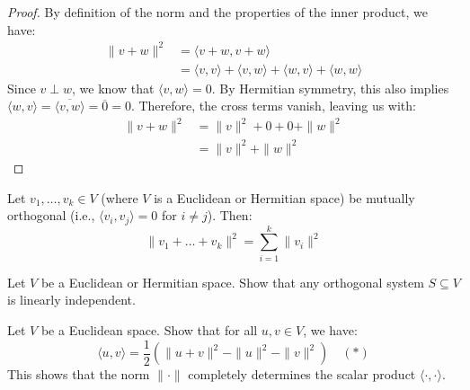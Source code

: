 \begin{center}
\end{center}

\begin{proof}
By definition of the norm and the properties of the inner product, we have:
\begin{align*}
    \|v + w\|^2 &= \langle v + w, v + w \rangle \\
    &= \langle v, v \rangle + \langle v, w \rangle + \langle w, v \rangle + \langle w, w \rangle
\end{align*}
Since $v \perp w$, we know that $\langle v, w \rangle = 0$. By Hermitian symmetry, this also implies $\langle w, v \rangle = \overline{\langle v, w \rangle} = \overline{0} = 0$. Therefore, the cross terms vanish, leaving us with:
\begin{align*}
    \|v + w\|^2 &= \|v\|^2 + 0 + 0 + \|w\|^2 \\
    &= \|v\|^2 + \|w\|^2
\end{align*}
\end{proof}

\begin{exercise}
Let $v_1, \dots, v_k \in V$ (where $V$ is a Euclidean or Hermitian space) be mutually orthogonal (i.e., $\langle v_i, v_j \rangle = 0$ for $i \neq j$). Then:
\[
    \|v_1 + \dots + v_k\|^2 = \sum_{i=1}^k \|v_i\|^2
\]
\end{exercise}

\begin{exercise}
Let $V$ be a Euclidean or Hermitian space. Show that any orthogonal system $S \subseteq V$ is linearly independent.
\end{exercise}

\begin{exercise}
Let $V$ be a Euclidean space. Show that for all $u, v \in V$, we have:
\[
    \langle u, v \rangle = \frac{1}{2}\left(\|u+v\|^2 - \|u\|^2 - \|v\|^2\right) \quad (*)
\]
This shows that the norm $\|\cdot\|$ completely determines the scalar product $\langle\cdot,\cdot\rangle$.
\end{exercise}

